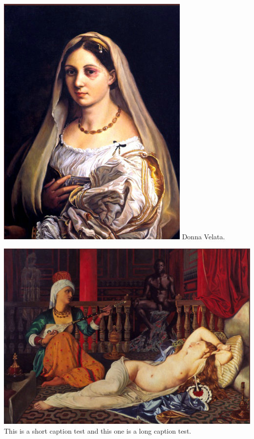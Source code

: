 \includegraphics[width=\textheight, width=\textwidth]{./images/woman.png}
Donna Velata.

\clearpage
\raggedbottom

\thispagestyle{plain}
\noindent\includegraphics[width=\textwidth]{./images/odalisque.png} \vskip0pt%
This is a short caption test and this one is a long caption test.

